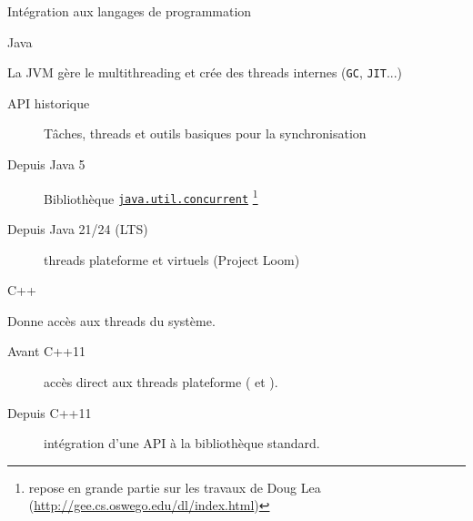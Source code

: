 
\begingroup

\begin{frame}{Intégration aux langages de programmation}
  
  \begin{block}{Java}
    
    La JVM gère le multithreading et crée des threads internes (\texttt{GC}, \texttt{JIT}...)

    \begin{description}
    \item[API historique] Tâches, threads et outils basiques pour la synchronisation
    \item[Depuis Java 5] Bibliothèque \href{https://docs.oracle.com/javase/8/docs/api/java/util/concurrent/package-summary.html}{\lstinline{java.util.concurrent}}
      \footnote{repose en grande partie sur les travaux de Doug Lea (\url{http://gee.cs.oswego.edu/dl/index.html})}
    \item[Depuis Java 21/24 (LTS)] threads plateforme et virtuels (Project Loom)
    \end{description}

  \end{block}

  \begin{block}{C++}

    Donne accès aux threads du système.

    \begin{description}
    \item[Avant C++11] accès direct aux threads plateforme ( et ).
    \item[Depuis C++11] intégration d'une API à la bibliothèque standard.
    \end{description}

  \end{block}

\end{frame}

\endgroup
\endinput
